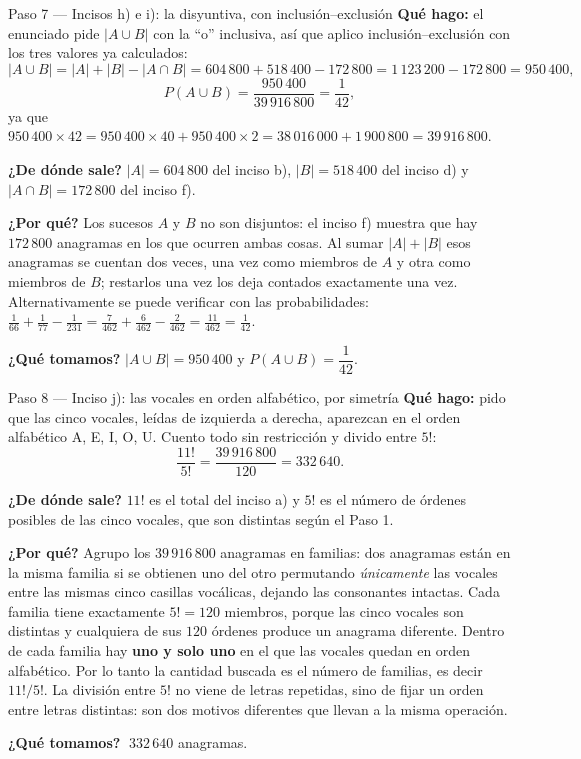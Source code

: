 \documentclass[11pt]{article}
\begin{document}
\begin{paso}{Paso 7 --- Incisos h) e i): la disyuntiva, con inclusión--exclusión}
\textbf{Qué hago:} el enunciado pide $|A\cup B|$ con la ``o'' inclusiva, así que aplico
inclusión--exclusión con los tres valores ya calculados:
\[
|A\cup B|=|A|+|B|-|A\cap B|=604\,800+518\,400-172\,800=1\,123\,200-172\,800=950\,400 ,
\]
\[
P(A\cup B)=\frac{950\,400}{39\,916\,800}=\frac{1}{42},
\]
ya que $950\,400\times42=950\,400\times40+950\,400\times2=38\,016\,000+1\,900\,800=39\,916\,800$.

\textbf{¿De dónde sale?} $|A|=604\,800$ del inciso b), $|B|=518\,400$ del inciso d) y
$|A\cap B|=172\,800$ del inciso f).

\textbf{¿Por qué?} Los sucesos $A$ y $B$ no son disjuntos: el inciso f) muestra que hay $172\,800$
anagramas en los que ocurren ambas cosas. Al sumar $|A|+|B|$ esos anagramas se cuentan dos veces, una vez
como miembros de $A$ y otra como miembros de $B$; restarlos una vez los deja contados exactamente una vez.
Alternativamente se puede verificar con las probabilidades:
$\frac{1}{66}+\frac{1}{77}-\frac{1}{231}=\frac{7}{462}+\frac{6}{462}-\frac{2}{462}=\frac{11}{462}=\frac{1}{42}$.

\textbf{¿Qué tomamos?} $|A\cup B|=950\,400$ y $P(A\cup B)=\dfrac{1}{42}$.
\end{paso}

\begin{paso}{Paso 8 --- Inciso j): las vocales en orden alfabético, por simetría}
\textbf{Qué hago:} pido que las cinco vocales, leídas de izquierda a derecha, aparezcan en el orden
alfabético A, E, I, O, U. Cuento todo sin restricción y divido entre $5!$:
\[
\frac{11!}{5!}=\frac{39\,916\,800}{120}=332\,640 .
\]

\textbf{¿De dónde sale?} $11!$ es el total del inciso a) y $5!$ es el número de órdenes posibles de las
cinco vocales, que son distintas según el Paso 1.

\textbf{¿Por qué?} Agrupo los $39\,916\,800$ anagramas en familias: dos anagramas están en la misma familia
si se obtienen uno del otro permutando \emph{únicamente} las vocales entre las mismas cinco casillas
vocálicas, dejando las consonantes intactas. Cada familia tiene exactamente $5!=120$ miembros, porque las
cinco vocales son distintas y cualquiera de sus $120$ órdenes produce un anagrama diferente. Dentro de cada
familia hay \textbf{uno y solo uno} en el que las vocales quedan en orden alfabético. Por lo tanto la
cantidad buscada es el número de familias, es decir $11!/5!$. La división entre $5!$ no viene de letras
repetidas, sino de fijar un orden entre letras distintas: son dos motivos diferentes que llevan a la misma
operación.

\textbf{¿Qué tomamos?} $\;332\,640$ anagramas.
\end{paso}
\end{document}
